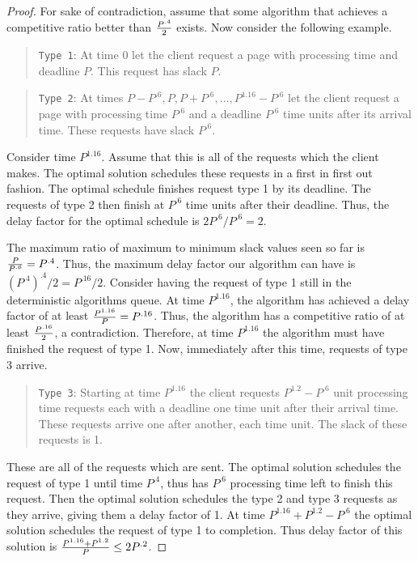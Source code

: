\documentclass[11pt]{article}
\begin{document}
\begin{proof}
For sake of contradiction, assume that some algorithm that
achieves a competitive ratio better than  ${{P^{.4}} \over
2}$ exists. Now consider the following example.

\begin{quotation}
\noindent \texttt{Type 1}:  At time $0$ let the client request a
page with processing time and deadline $P$.  This request
has slack $P$.
\end{quotation}

\begin{quotation}
\noindent \texttt{Type 2}:  At times $P - P^{.6},
P, P + P^{.6}, \ldots, P^{1.16} - P^{.6}$
let the client request a page with processing time $P^{.6}$
and a deadline $P^{.6}$ time units after its arrival time.
These requests have slack $P^{.6}$. \noindent
\end{quotation}


Consider time $P^{1.16}.$  Assume that this is all of the
requests which the client makes.  The optimal solution schedules
these requests in a first in first out fashion.  The optimal
schedule finishes request type 1 by its deadline.  The requests of
type 2 then finish at $P^{.6}$ time units after their
deadline. Thus, the delay factor for the optimal schedule is
$2P^{.6}/P^{.6} = 2$.

The maximum ratio of maximum to minimum slack values seen so far
is ${P \over P^{.6}} = P^{.4}$.  Thus, the maximum
delay factor our algorithm can have is $(P^{.4})^{.4} / 2 =
P^{.16}/2$. Consider having the request of type 1 still in
the deterministic algorithms queue.  At time $P^{1.16}$, the
algorithm has achieved a delay factor of at least ${P^{1.16}
\over P} = P^{.16}$.  Thus, the algorithm has a
competitive ratio of at least $P^{.16} \over 2$, a
contradiction. Therefore, at time $P^{1.16}$ the algorithm
must have finished the request of type 1.  Now, immediately after
this time, requests of type 3 arrive.

\begin{quotation}
\noindent \texttt{Type 3}: Starting at time $P^{1.16}$ the
client requests $P^{1.2} - P^{.6}$ unit processing time
requests each with a deadline one time unit after their arrival
time. These requests arrive one after another, each time unit. The
slack of these requests is 1.
\end{quotation}

These are all of the requests which are sent.  The optimal
solution schedules the request of type 1 until time $P^{.4}$,
thus has $P^{.6}$ processing time left to finish this
request. Then the optimal solution schedules the type 2 and type 3
requests as they arrive, giving them a delay factor of 1.  At time
$P^{1.16} + P^{1.2} - P^{.6}$ the optimal solution
schedules the request of type 1 to completion.  Thus delay factor
of this solution is ${{P^{1.16} + P^{1.2}} \over
{P}} \leq 2P^{.2}$.


\end{proof}
\end{document}
